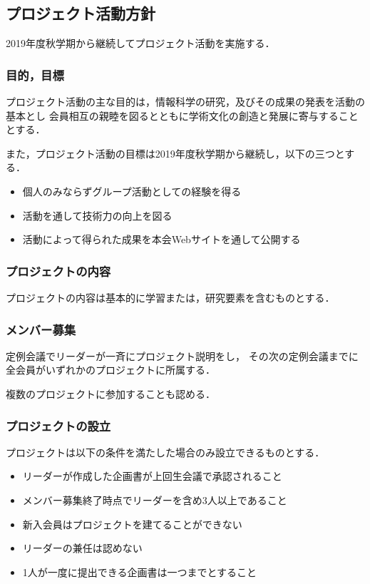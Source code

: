 \subsection*{プロジェクト活動方針}

2019年度秋学期から継続してプロジェクト活動を実施する．

\subsubsection*{目的，目標}
プロジェクト活動の主な目的は，情報科学の研究，及びその成果の発表を活動の基本とし
会員相互の親睦を図るとともに学術文化の創造と発展に寄与することとする．

また，プロジェクト活動の目標は2019年度秋学期から継続し，以下の三つとする．

\begin{itemize}
\item 個人のみならずグループ活動としての経験を得る
\item 活動を通して技術力の向上を図る
\item 活動によって得られた成果を本会Webサイトを通して公開する
\end{itemize}


\subsubsection*{プロジェクトの内容}
プロジェクトの内容は基本的に学習または，研究要素を含むものとする．

\subsubsection*{メンバー募集}
定例会議でリーダーが一斉にプロジェクト説明をし，
その次の定例会議までに全会員がいずれかのプロジェクトに所属する．

複数のプロジェクトに参加することも認める．

\subsubsection*{プロジェクトの設立}
プロジェクトは以下の条件を満たした場合のみ設立できるものとする．

\begin{itemize}
\item リーダーが作成した企画書が上回生会議で承認されること
\item メンバー募集終了時点でリーダーを含め3人以上であること
\item 新入会員はプロジェクトを建てることができない
\item リーダーの兼任は認めない
\item 1人が一度に提出できる企画書は一つまでとすること
\end{itemize}

